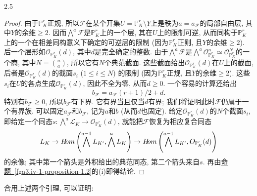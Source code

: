 \begin{lemma}{2.5}
\begin{proof}
\par{}由于\(\mathbb {P}_K^r\)正规, 所以\(\mathscr {F}\)在某个开集\(U=\mathbb {P}_K^r\setminus  Y\)上是秩为\(a=a_\mathscr {F}\)的局部自由层, 其中\(Y\)的余维\(\geqslant 2\). 因而\(\bigwedge ^a\mathscr {F}\)是\(\mathbb {P}_K^r\)上的一个层, 其在\(U\)上的限制可逆, 从而同构于\(\mathbb {P}_K^r\)上的一个在相差同构意义下确定的可逆层的限制 (因为\(\mathbb {P}_K^r\)正则, 且\(Y\)的余维\(\geqslant 2\)). 后一个层形如\(\mathcal {O}_{\mathbb {P}_K^r}(d)\), 其中\(d\)是完全确定的整数. 由于\(\bigwedge ^a\mathscr {F}\)是\(\bigwedge ^a\mathcal {O}_{\mathbb {P}_K^r}^n\simeq \mathcal {O}_{\mathbb {P}_K^r}^N\)的一个商, 其中\(N=\binom {n}{a}\), 所以它有\(N\)个典范截面. 这些截面给出\(\mathcal {O}_{\mathbb {P}_K^r}(d)\)在\(U\)上的截面, 后者是\(\mathcal {O}_{\mathbb {P}_K^r}(d)\)的截面\(s_i\) (\(1\leqslant  i\leqslant  N\)) 的限制 (因为\(\mathbb {P}_K^r\)正规, 且\(Y\)的余维\(\geqslant 2\)). 这些\(s_i\)在\(U\)的各点生成\(\mathcal {O}_{\mathbb {P}_K^r}(d)\), 因此不全为零, 从而\(d\geqslant 0\). 一个容易的计算还给出\[         b_\mathscr {F}         = a_\mathscr {F}(r+1)/2 + d.\] 特别有\(b_\mathscr {F}\geqslant 0\), 所以\(b_\mathscr {F}\)有下界. 它有界当且仅当\(d\)有界; 我们将证明此时\(\mathscr {F}\)仍属于一个有界族. 可以固定\(a_\mathscr {F}\)和\(b_\mathscr {F}\), 记为\(a\)和\(b\) (从而\(d\)也固定). 给定\(\mathcal {O}_{\mathbb {P}_K^r}(d)\)的\(N\)个截面\(s_i\), 即给定一个同态\(s\colon \bigwedge ^a\mathscr {L}_K\to \mathcal {O}_{\mathbb {P}_K^r}(d)\), 就能把\(\mathscr {F}\)恢复为相应复合同态\[         \mathscr {L}_K         \to  \mathscr {H}\kern  -2.5pt\mathit {om}\left ( \bigwedge ^{a-1}\mathscr {L}_{K'}, \bigwedge ^a\mathscr {L}_K \right )         \to  \mathscr {H}\kern  -2.5pt\mathit {om}\left ( \bigwedge ^{a-1}\mathscr {L}_{K'}, \mathcal {O}_{\mathbb {P}_K^r}(d) \right )       \]的余像; 其中第一个箭头是外积给出的典范同态, 第二个箭头来自\(s\). 再由\hyperref[fga3.iv-1-proposition-1.2]{命题~\ref*{fga3.iv-1-proposition-1.2}}的(i)即得结论.
\end{proof}
\end{lemma}
\par{}合用上述两个引理, 可以证明:
